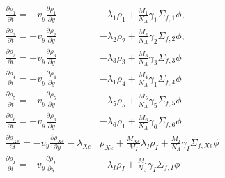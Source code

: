 \begin{equation}
\begin{split}
    \frac{\partial \rho_{1}}{\partial t} = -v_{y}\frac{\partial \rho_{1}}{\partial y} &- \lambda_{1}\rho_{1} + \frac{M_{1}}{N_{A}}\gamma_{1}\Sigma_{f,1}\phi, \\ 
    \frac{\partial \rho_{2}}{\partial t} = -v_{y}\frac{\partial \rho_{2}}{\partial y} &- \lambda_{2}\rho_{2} + \frac{M_{2}}{N_{A}}\gamma_{2}\Sigma_{f,2}\phi, \\ 
    \frac{\partial \rho_{3}}{\partial t} = -v_{y}\frac{\partial \rho_{3}}{\partial y} &- \lambda_{3}\rho_{3} + \frac{M_{3}}{N_{A}}\gamma_{3}\Sigma_{f,3}\phi \\
    \frac{\partial \rho_{4}}{\partial t} = -v_{y}\frac{\partial \rho_{4}}{\partial y} &- \lambda_{1}\rho_{4} + \frac{M_{4}}{N_{A}}\gamma_{1}\Sigma_{f,4}\phi \\
    \frac{\partial \rho_{5}}{\partial t} = -v_{y}\frac{\partial \rho_{5}}{\partial y} &- \lambda_{5}\rho_{5} + \frac{M_{5}}{N_{A}}\gamma_{5}\Sigma_{f,5}\phi \\
    \frac{\partial \rho_{6}}{\partial t} = -v_{y}\frac{\partial \rho_{6}}{\partial y} &- \lambda_{6}\rho_{1} + \frac{M_{6}}{N_{A}}\gamma_{6}\Sigma_{f,6}\phi \\
    \frac{\partial \rho_{Xe}}{\partial t} = -v_{y}\frac{\partial \rho_{Xe}}{\partial y} - \lambda_{Xe}&\rho_{Xe} + \frac{M_{Xe}}{M_{I}}\lambda_{I}\rho_{I} +  \frac{M_{I}}{N_{A}}\gamma_{I}\Sigma_{f,Xe}\phi \\
    \frac{\partial \rho_{I}}{\partial t} = -v_{y}\frac{\partial \rho_{I}}{\partial y} &- \lambda_{I}\rho_{I} + \frac{M_{I}}{N_{A}}\gamma_{I}\Sigma_{f,I}\phi
\end{split}
\label{eq:problem3}
\end{equation}